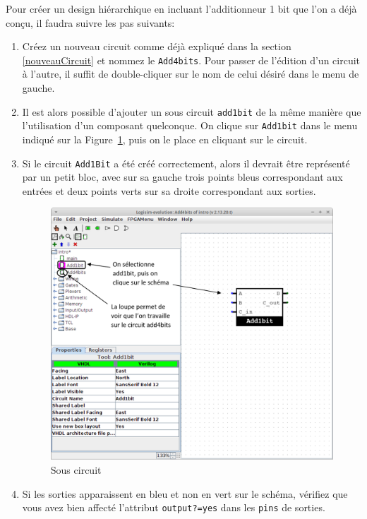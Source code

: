 \documentclass[nosolution]{exercice}
\begin{document}
Pour créer un design hiérarchique en incluant l'additionneur 1 bit que l'on a déjà conçu, il faudra suivre les pas
suivants:
\begin{enumerate}
\item Créez un nouveau circuit comme déjà expliqué dans la section \ref{nouveauCircuit} et nommez le \texttt{Add4bits}.
Pour passer de l'édition d'un circuit à l'autre, il suffit de double-cliquer sur le nom de celui désiré dans le menu de
gauche.
\item Il est alors possible d'ajouter un sous circuit \texttt{add1bit} de la même manière que l'utilisation d'un
composant quelconque. On clique sur \texttt{Add1bit} dans le menu indiqué sur la Figure~\ref{fig_sousCircuit}, puis on le
place en cliquant sur le circuit.
\item Si le circuit \texttt{Add1Bit} a été créé correctement, alors il devrait être représenté par un petit bloc, avec
sur sa gauche trois points bleus correspondant aux entrées et deux points verts sur sa droite correspondant aux sorties.

\begin{figure}[H]
\begin{center}
\includegraphics[width=300pt]{images/logisim_sousCircuit.png}
\caption{\label{fig_sousCircuit}Sous circuit}
\end{center}
\end{figure}

\item Si les sorties apparaissent en bleu et non en vert sur le schéma, vérifiez que vous avez bien affecté l'attribut
\texttt{output?=yes} dans les \texttt{pins} de sorties.


\end{enumerate}
\end{document}
